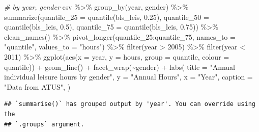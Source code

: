 \documentclass[
]{article}
\newenvironment{Shaded}{\begin{snugshade}}{\end{snugshade}}
\newcommand{\AttributeTok}[1]{\textcolor[rgb]{0.77,0.63,0.00}{#1}}
\newcommand{\CommentTok}[1]{\textcolor[rgb]{0.56,0.35,0.01}{\textit{#1}}}
\newcommand{\DecValTok}[1]{\textcolor[rgb]{0.00,0.00,0.81}{#1}}
\newcommand{\FloatTok}[1]{\textcolor[rgb]{0.00,0.00,0.81}{#1}}
\newcommand{\FunctionTok}[1]{\textcolor[rgb]{0.00,0.00,0.00}{#1}}
\newcommand{\NormalTok}[1]{#1}
\newcommand{\SpecialCharTok}[1]{\textcolor[rgb]{0.00,0.00,0.00}{#1}}
\newcommand{\StringTok}[1]{\textcolor[rgb]{0.31,0.60,0.02}{#1}}
\begin{document}
\begin{Shaded}
\begin{Highlighting}[]
\CommentTok{\# by year, gender}
\NormalTok{csv }\SpecialCharTok{\%\textgreater{}\%}
  \FunctionTok{group\_by}\NormalTok{(year, gender) }\SpecialCharTok{\%\textgreater{}\%}
  \FunctionTok{summarize}\NormalTok{(}\AttributeTok{quantile\_25 =} \FunctionTok{quantile}\NormalTok{(bls\_leis, }\FloatTok{0.25}\NormalTok{), }\AttributeTok{quantile\_50 =} \FunctionTok{quantile}\NormalTok{(bls\_leis, }\FloatTok{0.5}\NormalTok{), }\AttributeTok{quantile\_75 =} \FunctionTok{quantile}\NormalTok{(bls\_leis, }\FloatTok{0.75}\NormalTok{)) }\SpecialCharTok{\%\textgreater{}\%}
  \FunctionTok{clean\_names}\NormalTok{() }\SpecialCharTok{\%\textgreater{}\%}
  \FunctionTok{pivot\_longer}\NormalTok{(quantile\_25}\SpecialCharTok{:}\NormalTok{quantile\_75, }\AttributeTok{names\_to =} \StringTok{"quantile"}\NormalTok{, }\AttributeTok{values\_to =} \StringTok{"hours"}\NormalTok{) }\SpecialCharTok{\%\textgreater{}\%}
  \FunctionTok{filter}\NormalTok{(year }\SpecialCharTok{\textgreater{}} \DecValTok{2005}\NormalTok{) }\SpecialCharTok{\%\textgreater{}\%}
  \FunctionTok{filter}\NormalTok{(year }\SpecialCharTok{\textless{}} \DecValTok{2011}\NormalTok{) }\SpecialCharTok{\%\textgreater{}\%}
  \FunctionTok{ggplot}\NormalTok{(}\FunctionTok{aes}\NormalTok{(}\AttributeTok{x =}\NormalTok{ year, }\AttributeTok{y =}\NormalTok{ hours, }\AttributeTok{group =}\NormalTok{ quantile, }\AttributeTok{colour =}\NormalTok{ quantile)) }\SpecialCharTok{+}
  \FunctionTok{geom\_line}\NormalTok{() }\SpecialCharTok{+}
  \FunctionTok{facet\_wrap}\NormalTok{(}\SpecialCharTok{\textasciitilde{}}\NormalTok{gender) }\SpecialCharTok{+}
    \FunctionTok{labs}\NormalTok{(}
  \AttributeTok{title =} \StringTok{"Annual individual leisure hours by gender"}\NormalTok{,}
  \AttributeTok{y =} \StringTok{"Annual Hours"}\NormalTok{,}
  \AttributeTok{x =} \StringTok{"Year"}\NormalTok{,}
  \AttributeTok{caption =} \StringTok{"Data from ATUS"}\NormalTok{,}
\NormalTok{) }
\end{Highlighting}
\end{Shaded}

\begin{verbatim}
## `summarise()` has grouped output by 'year'. You can override using the
## `.groups` argument.
\end{verbatim}
\end{document}
